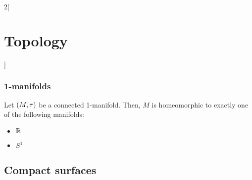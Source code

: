 \documentclass[../../../main.tex]{subfiles}
\begin{document}
\begin{multicols}{2}[\section{Topology}]
  \subsubsection{1-manifolds}
  \begin{theorem}
    Let $(M,\tau)$ be a connected 1-manifold. Then, $M$ is homeomorphic to exactly one of the following manifolds:
    \begin{itemize}
      \item $\mathbb{R}$
      \item $S^1$
    \end{itemize}
  \end{theorem}
  \subsection{Compact surfaces}

\end{multicols}
\end{document}
